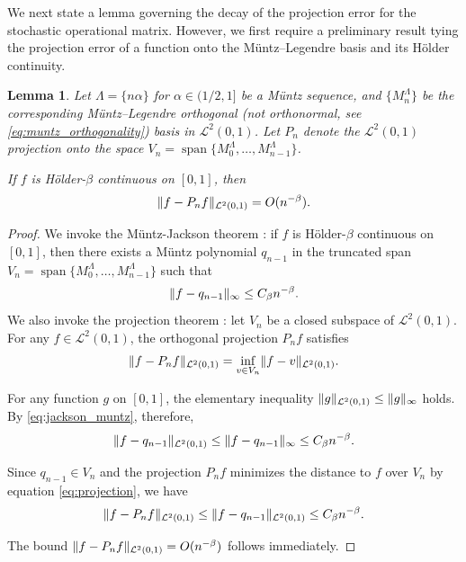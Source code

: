 \documentclass[11pt, a4paper]{article}
\theoremstyle{theoremstyle}
\newtheorem{lemma}[theorem]{Lemma}
\theoremstyle{definitionstyle}
\DeclareMathOperator{\linspan}{span}
\DeclarePairedDelimiter{\norm}{\lVert}{\rVert}
\begin{document}
We next state a lemma governing the decay of the projection error for the stochastic operational matrix. However, we first require a preliminary result tying the projection error of a function onto the M\"untz--Legendre basis and its H\"older continuity.
\begin{lemma}\label{lem:jackson}
    Let $\Lambda = \{n\alpha\}$ for $\alpha \in (1/2, 1]$ be a M\"untz sequence, and $\{M_n^\Lambda\}$ be the corresponding M\"untz--Legendre orthogonal (not orthonormal, see \eqref{eq:muntz_orthogonality}) basis in $\mathcal L^2(0, 1)$. Let $P_n$ denote the $\mathcal L^2(0, 1)$ projection onto the space $V_n = \linspan \{M_0^\Lambda, \dots , M_{n-1}^\Lambda\}$.

    If $f$ is H\"older-$\beta$ continuous on $[0, 1]$, then
    \begin{equation}
        \norm{f - P_nf}_{\mathcal L^2(0, 1)} = O(n^{-\beta}).
    \end{equation}
\end{lemma}
\begin{proof}
    We invoke the Müntz-Jackson theorem \cite{GOLITSCHEK1991337}: if $f$ is Hölder-$\beta$ continuous on $[0, 1]$, then there exists a Müntz polynomial $q_{n-1}$ in the truncated span $V_n = \linspan\{M_0^\Lambda, \dots, M_{n-1}^\Lambda\}$ such that
    \begin{equation}\label{eq:jackson_muntz}
        \norm{f - q_{n-1}}_{\infty} \le C_\beta n^{-\beta}.
    \end{equation}
    We also invoke the projection theorem \cite{rudin1991functional}: let $V_n$ be a closed subspace of $\mathcal L^2(0, 1)$. For any $f \in \mathcal L^2(0, 1)$, the orthogonal projection $P_n f$ satisfies
    \begin{equation}\label{eq:projection}
        \norm{f - P_nf}_{\mathcal L^2(0, 1)} = \inf_{v \in V_n} \norm{f - v}_{\mathcal L^2(0, 1)}.
    \end{equation}
    
    For any function $g$ on $[0, 1]$, the elementary inequality $\norm{g}_{\mathcal L^2(0, 1)} \le \norm{g}_{\infty}$ holds. By \eqref{eq:jackson_muntz}, therefore,
    \begin{equation}
        \norm{f - q_{n-1}}_{\mathcal L^2(0, 1)} \le \norm{f - q_{n-1}}_{\infty} \le C_\beta n^{-\beta}.
    \end{equation}
    
    Since $q_{n-1} \in V_n$ and the projection $P_n f$ minimizes the distance to $f$ over $V_n$ by equation \eqref{eq:projection}, we have
    \begin{equation}
        \norm{f - P_nf}_{\mathcal L^2(0, 1)} \le \norm{f - q_{n-1}}_{\mathcal L^2(0, 1)} 
        \le C_\beta n^{-\beta}.
    \end{equation}
    
    The bound $\norm{f - P_nf}_{\mathcal L^2(0, 1)} = O(n^{-\beta})$ follows immediately.
\end{proof}
\end{document}
